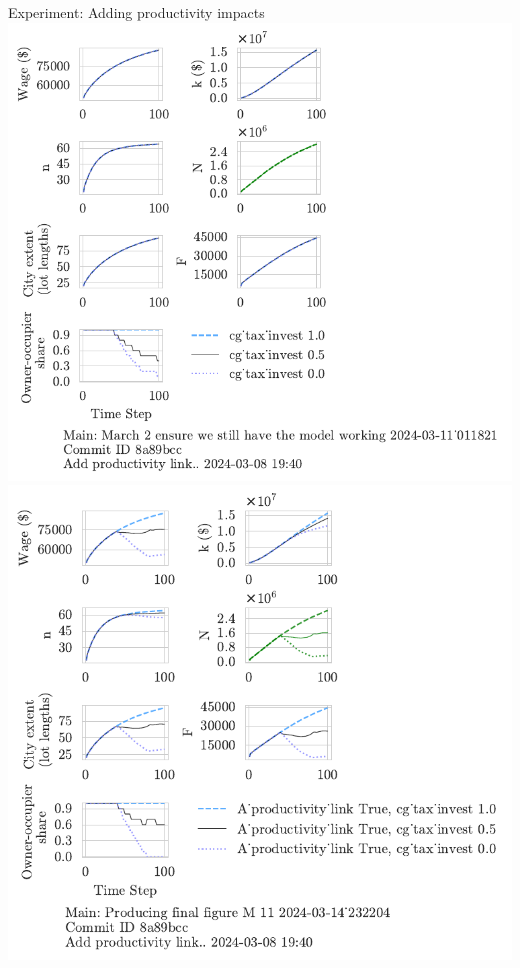 \documentclass[notes=show]{beamer} %
\begin{document}
\begin{frame}{Experiment: Adding productivity impacts}
     \includegraphics[scale=.55, trim={0 1.4cm 4.5cm 0},clip]{fig/cg_tax_invest-Main-011821.pdf} 
    \includegraphics[scale=.55, trim={0 1.4cm 3.8cm 0},clip]{fig/With-productivity_linkcg_tax_invest-232204.pdf} 
\end{frame}%
\end{document}
